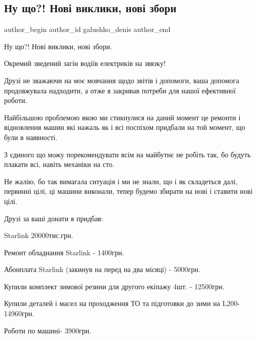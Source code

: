  
 
 
 
 

\subsection{Ну що?!  Нові виклики, нові збори}
\label{sec:11_10_2022.fb.galushko_denis.1.nu_shcho___nov__vik}

\ifcmt
 author_begin
   author_id galushko_denis
 author_end
\fi

Ну що?!  Нові виклики, нові збори. 

Окремий зведений загін водіїв електриків на звязку!

Друзі не зважаючи на моє мовчання щодо звітів і допомоги, ваша допомога
продовжувала надходити, а отже я закривав потреби для нашої ефективної роботи. 

Найбільшою проблемою якою ми стикнулися на даний момент це ремонти і
відновлення машин які нажаль як і всі поспіхом придбали на той момент, що були
в наявності.

З єдиного що можу порекомендувати всім на майбутнє не робіть так, бо будуть
плакати всі, навіть механіки на сто.  

Не жалію, бо так вимагала ситуація і ми не знали, що і як складеться далі,
первинні цілі, ці машини виконали, тепер будемо збирати на нові і ставити нові
цілі. 

Друзі за ваші донати я придбав: 

Starlink 20000тис.грн.

Ремонт обладнання Starlink - 1400грн.

Абонплата Starlink (закинув на перед на два місяці) - 5000грн. 

Купили комплект зимової резини для другого екіпажу 4шт. - 12500грн.

Купили деталей і масел на проходження ТО та підготовки до зими на  L200-
14960грн.

Роботи по машині- 3900грн.


